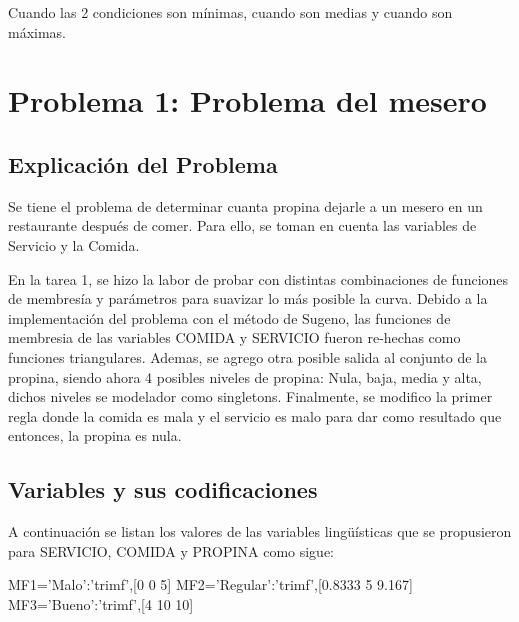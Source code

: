 \documentclass[11pt, letterpaper]{article}
\begin{document}
Cuando las 2 condiciones son mínimas, cuando son medias y cuando son máximas.

\newpage


\section{Problema 1: Problema del mesero}

\subsection{Explicación del Problema}

Se tiene el problema de determinar cuanta propina dejarle a un mesero en un restaurante después de comer. Para ello, se toman en cuenta las variables de Servicio y la Comida.

En la tarea 1, se hizo la labor de probar con distintas combinaciones de funciones de membresía y parámetros para suavizar lo más posible la curva. Debido a la implementación del problema con el método de Sugeno, las funciones de membresia de las variables COMIDA y SERVICIO fueron re-hechas como funciones triangulares. Ademas, se agrego otra posible salida al conjunto de la propina, siendo ahora 4 posibles niveles de propina: Nula, baja, media y alta, dichos niveles se modelador como singletons. Finalmente, se modifico la primer regla donde la comida es mala y el servicio es malo para dar como resultado que entonces, la propina es nula.


\subsection{Variables y sus codificaciones}

A continuación se listan los valores de las variables lingüísticas que se propusieron para SERVICIO, COMIDA y PROPINA como sigue:

MF1='Malo':'trimf',[0 0 5]
MF2='Regular':'trimf',[0.8333 5 9.167]
MF3='Bueno':'trimf',[4 10 10]
\end{document}
